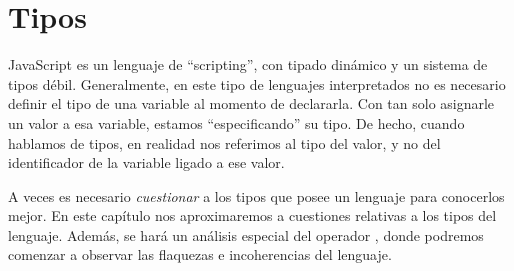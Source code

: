 \chapter{Tipos} %

\label{ch:tipos} %


JavaScript es un lenguaje de "`scripting"', con tipado dinámico y un sistema de tipos débil. Generalmente, en este tipo de lenguajes interpretados no es necesario definir el tipo de una variable al momento de declararla. Con tan solo asignarle un valor a esa variable, estamos "`especificando"' su tipo. De hecho, cuando hablamos de tipos, en realidad nos referimos al tipo del valor, y no del identificador de la variable ligado a ese valor.

A veces es necesario \textit{cuestionar} a los tipos que posee un lenguaje para conocerlos mejor. En este capítulo nos aproximaremos a cuestiones relativas a los tipos del lenguaje. Además, se hará un análisis especial del operador , donde podremos comenzar a observar las flaquezas e incoherencias del lenguaje.


